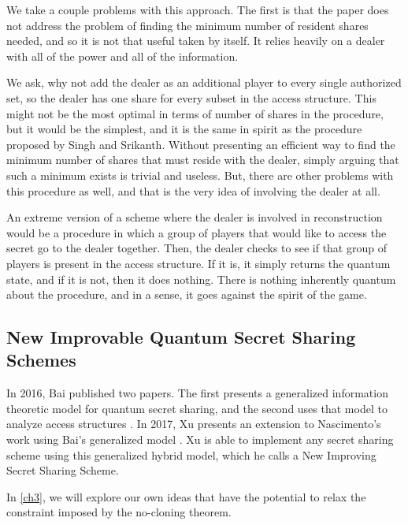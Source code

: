 We take a couple problems with this approach. The first is that the paper does not address the problem of finding the minimum number of resident shares needed, and so it is not that useful taken by itself. It relies heavily on a dealer with all of the power and all of the information. 

We ask, why not add the dealer as an additional player to every single authorized set, so the dealer has one share for every subset in the access structure. This might not be the most optimal in terms of number of shares in the procedure, but it would be the simplest, and it is the same in spirit as the procedure proposed by Singh and Srikanth. Without presenting an efficient way to find the minimum number of shares that must reside with the dealer, simply arguing that such a minimum exists is trivial and useless. But, there are other problems with this procedure as well, and that is the very idea of involving the dealer at all.

An extreme version of a scheme where the dealer is involved in reconstruction would be a procedure in which a group of players that would like to access the secret go to the dealer together. Then, the dealer checks to see if that group of players is present in the access structure. If it is, it simply returns the quantum state, and if it is not, then it does nothing. There is nothing inherently quantum about the procedure, and in a sense, it goes against the spirit of the game.

\subsection{New Improvable Quantum Secret Sharing Schemes}
\label{ssec:niqss}

In 2016, Bai published two papers. The first presents a generalized information theoretic model for quantum secret sharing, and the second uses that model to analyze access structures \cite{bai_generalized_2016} \cite{bai_quantum_2017}. In 2017, Xu presents an extension to Nascimento's \cite{nascimento_improving_2001} work using Bai's generalized model \cite{xu_new_2017}. Xu is able to implement any secret sharing scheme using this generalized hybrid model, which he calls a New Improving Secret Sharing Scheme. 

In \cref{ch3}, we will explore our own ideas that have the potential to relax the constraint imposed by the no-cloning theorem.
